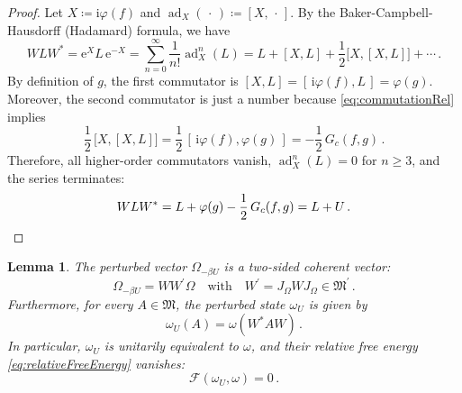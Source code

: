 \documentclass[a4paper, twoside, 11pt, reqno]{amsart}
\theoremstyle{definition}
\theoremstyle{plain}
\newtheorem{lemma}[definition]{Lemma}
\renewcommand{\Omega}{\varOmega}
\newcommand{\MF}{\mathcal{F}}
\newcommand{\MFM}{\mathfrak{M}}
\newcommand{\ii}{\mathrm{i}}
\newcommand{\ee}{\mathrm{e}}
\newcommand{\comm}[1]{#1^{\prime}}
\newcommand{\1}{\mathbf{1}}
\newcommand{\ce}{\coloneqq}
\newcommand{\ph}{\varphi}
\newcommand{\Gc}{G_{c}}
\begin{document}
\begin{proof}
    Let $X \ce \ii \ph(f)$ and $\operatorname{ad}_X (\,\cdot\,) \ce [X,\,\cdot\,]$. By the Baker-Campbell-Hausdorff (Hadamard) formula, we have
    \begin{equation*}
          W L W^\ast = \ee^{X} L \, \ee^{-X} = \sum_{n=0}^{\infty} \frac{1}{n!} \operatorname{ad}_X^{n} (L) = L + [X,L] + \frac{1}{2} \bigl[X, [X,L]\bigr] + \dotsb \, .
    \end{equation*}
    By definition of $g$, the first commutator is $[X,L] = [\,\ii \ph(f), L \,] = \ph(g)$. Moreover, the second commutator is just a number because \cref{eq:commutationRel} implies
    \begin{equation*}
        \frac{1}{2} \, \bigl[ X, [X,L] \bigr] = \frac{1}{2} \, [\, \ii \ph(f), \ph(g) \,] = - \frac{1}{2} \, \Gc(f,g) \, .
    \end{equation*}
    Therefore, all higher-order commutators vanish, $\operatorname{ad}_X^{n} (L) = 0$ for $n\ge3$, and the series terminates:
    \begin{equation*}
        W L W^\ast = L + \ph(g) - \frac{1}{2} \, \Gc(f,g) = L + U \, . \qedhere
    \end{equation*}
    \end{proof}
    
\begin{lemma}\label{lem:coherent}
    The perturbed vector $\Omega_{- \beta U}$ is a {two-sided coherent vector}:
    \begin{equation*}
        \Omega_{- \beta U} = W W^\prime \Omega \quad \text{with} \quad W^\prime = J_\Omega W J_\Omega \in \comm{\MFM} \, .
    \end{equation*}
    Furthermore, for every $A \in \MFM$, the perturbed state $\omega_U$ is given by
    \begin{equation*}
        \omega_U(A) = \omega (W^\ast A W) \, .
    \end{equation*}
    In particular, $\omega_U$ is unitarily equivalent to $\omega$, and their relative free energy \eqref{eq:relativeFreeEnergy} vanishes:
    \begin{equation*}
        \MF (\omega_U, \omega) = 0 \, .
    \end{equation*}
\end{lemma}
\end{document}
